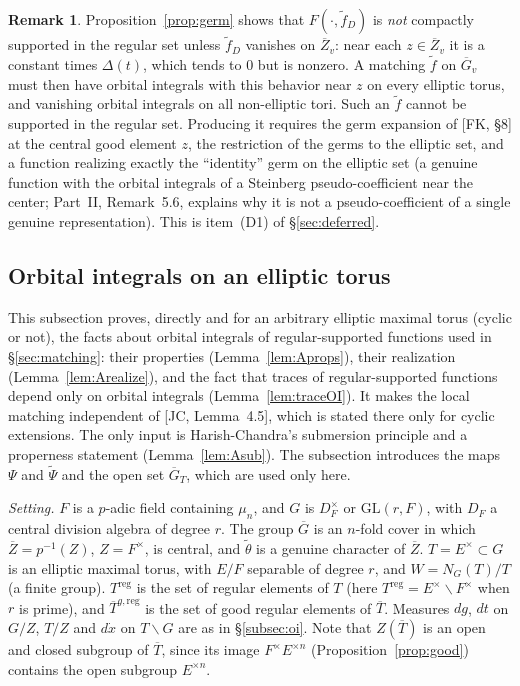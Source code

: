 \documentclass[12pt]{article}
\newcommand{\ov}[1]{\overline{#1}}
\newcommand{\reg}{\mathrm{reg}}
\newcommand{\GL}{\mathrm{GL}}
\newcommand{\Gb}{\ov{G}}
\newcommand{\Zb}{\ov{Z}}
\newcommand{\Tb}{\ov{T}}
\theoremstyle{plain}
\theoremstyle{definition}
\newtheorem{remark}[theorem]{Remark}
\begin{document}
\begin{remark}
Proposition~\ref{prop:germ} shows that $F(\cdot,\tilde f_D)$ is \emph{not} compactly supported in the regular set unless $\tilde f_D$ vanishes on $\Zb_v$: near each $z\in\Zb_v$ it is a constant times $\Delta(t)$, which tends to $0$ but is nonzero. A matching $\tilde f$ on $\Gb_v$ must then have orbital integrals with this behavior near $z$ on every elliptic torus, and vanishing orbital integrals on all non-elliptic tori. Such an $\tilde f$ cannot be supported in the regular set. Producing it requires the germ expansion of [FK, \S8] at the central good element $z$, the restriction of the germs to the elliptic set, and a function realizing exactly the ``identity'' germ on the elliptic set (a genuine function with the orbital integrals of a Steinberg pseudo-coefficient near the center; Part~II, Remark~5.6, explains why it is not a pseudo-coefficient of a single genuine representation). This is item~(D1) of \S\ref{sec:deferred}.
\end{remark}


\subsection{Orbital integrals on an elliptic torus}\label{app:oi}
This subsection proves, directly and for an arbitrary elliptic maximal torus (cyclic or not), the facts about orbital integrals of regular-supported functions used in \S\ref{sec:matching}: their properties (Lemma~\ref{lem:Aprops}), their realization (Lemma~\ref{lem:Arealize}), and the fact that traces of regular-supported functions depend only on orbital integrals (Lemma~\ref{lem:traceOI}). It makes the local matching independent of [JC, Lemma~4.5], which is stated there only for cyclic extensions. The only input is Harish-Chandra's submersion principle and a properness statement (Lemma~\ref{lem:Asub}). The subsection introduces the maps $\Psi$ and $\tilde\Psi$ and the open set $\Gb_T$, which are used only here.

\emph{Setting.} $F$ is a $p$-adic field containing $\mu_n$, and $G$ is $D_F^\times$ or $\GL(r,F)$, with $D_F$ a central division algebra of degree $r$. The group $\Gb$ is an $n$-fold cover in which $\Zb=p^{-1}(Z)$, $Z=F^\times$, is central, and $\tilde\theta$ is a genuine character of $\Zb$. $T=E^\times\subset G$ is an elliptic maximal torus, with $E/F$ separable of degree $r$, and $W=N_G(T)/T$ (a finite group). $T^{\reg}$ is the set of regular elements of $T$ (here $T^{\reg}=E^\times\smallsetminus F^\times$ when $r$ is prime), and $\Tb^{g,\reg}$ is the set of good regular elements of $\Tb$. Measures $dg$, $dt$ on $G/Z$, $T/Z$ and $d\dot x$ on $T\backslash G$ are as in \S\ref{subsec:oi}. Note that $Z(\Tb)$ is an open and closed subgroup of $\Tb$, since its image $F^\times E^{\times n}$ (Proposition~\ref{prop:good}) contains the open subgroup $E^{\times n}$.
\end{document}
